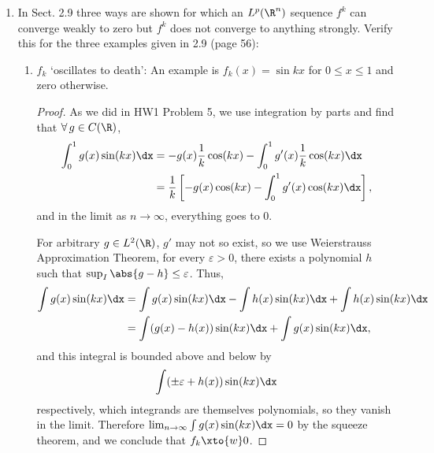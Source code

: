 \documentclass[12pt,letterpaper]{article}
\renewcommand{\epsilon}{\varepsilon}
\begin{document}
\begin{enumerate}
\begin{proof}
\pagebreak
(b) Let $p$ such that $\infty\geq r\geq p \geq q \geq 1$, and $f\in L^r(\Omega)\cap L^q(\Omega)$. Denote 
\begin{align*}
\{|f|\leq1\} &= \{x\in \Omega : |f(x)|\leq 1\},\text{ and }\\
\{|f|>1\} &= \{x\in \Omega : |f(x)|> 1\}.
\end{align*}
then observe that $|f|^p$ is summable:
\begin{align*}
\int |f|^p &= \int_{\{|f|\leq1\}} |f|^p + \int_{\{|f|>1\}} |f|^p \\
&= \int_{\{|f|\leq1\}} |f|^q + \int_{\{|f|>1\}} |f|^r \\
&= \int |f|^q + \int |f|^r \\
&<\infty. \qedhere
\end{align*}
\end{proof}	

\setcounter{enumi}{8}
\item In Sect. 2.9 three ways are shown for which an $L^p(\R^n)$ sequence $f^k$ can
converge weakly to zero but $f^k$ does not converge to anything strongly.
Verify this for the three examples given in 2.9 (page 56):
	\begin{enumerate}
	\item $f_k$ `oscillates to death': An example is $f_k(x) = \sin kx$ for $0 \leq x \leq 1$ and zero otherwise.
	\begin{proof} As we did in HW1 Problem 5, we use integration by parts and find that $\forall\,g\in C(\R)$, 
\begin{align*}
\int_0^1 g(x)\sin(kx) \dx &= -g(x)\frac{1}{k}\cos(kx) - \int_0^1 g'(x)\frac{1}{k}\cos(kx)\dx \\
&= \frac{1}{k}\left[-g(x)\cos(kx) - \int_0^1 g'(x)\cos(kx)\dx\right],
\end{align*}
and in the limit as $n\to \infty$, everything goes to 0. 

For arbitrary $g\in L^2(\R)$, $g'$ may not so exist, so we use Weierstrauss Approximation Theorem, for every $\epsilon>0$, there exists a polynomial $h$ such that $\sup_I\abs{g-h}\leq\epsilon$. Thus, 
\begin{align*}
\int g(x) \sin(kx)\dx &= \int g(x)\sin(kx)\dx - \int h(x)\sin(kx)\dx + \int h(x)\sin(kx)\dx \\
&= \int (g(x)-h(x))\sin(kx)\dx + \int g(x)\sin(kx)\dx,
\end{align*}
and this integral is bounded above and below by 
$$\int (\pm \epsilon +h(x))\sin(kx)\dx$$
respectively, which integrands are themselves polynomials, so they vanish in the limit. Therefore $\lim_{n\to\infty}\int g(x)\sin(kx)\dx=0$ by the squeeze theorem, and we conclude that $f_k\xto{w}0$. 


\end{proof}
\end{enumerate}
\end{enumerate}
\end{document}
